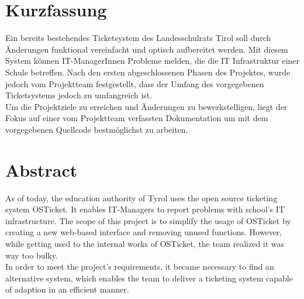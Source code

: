 \chapter*{Kurzfassung}
Ein bereits bestehendes Ticketsystem des Landesschulrats Tirol soll durch Änderungen funktional vereinfacht und optisch aufbereitet werden. Mit diesem System können IT-ManagerInnen Probleme melden, die die IT Infrastruktur einer Schule betreffen. Nach den ersten abgeschlossenen Phasen des Projektes, wurde jedoch vom Projektteam festgestellt, dass der Umfang des vorgegebenen Ticketsystems jedoch zu umfangreich ist.\\
Um die Projektziele zu erreichen und Änderungen zu bewerkstelligen, liegt der Fokus auf einer vom Projektteam verfassten Dokumentation um mit dem vorgegebenen Quellcode bestmöglichst zu arbeiten.

\chapter*{Abstract}
As of today, the education authority of Tyrol uses the open source ticketing system OSTicket. It enables IT-Managers to report problems with school’s IT infrastructure. The scope of this project is to simplify the usage of OSTicket by creating a new web-based interface and removing unused functions. However, while getting used to the internal works of OSTicket, the team realized it was way too bulky.\\
In order to meet the project’s requirements, it became necessary to find an alternative system, which enables the team to deliver a ticketing system capable of adaption in an efficient manner.


